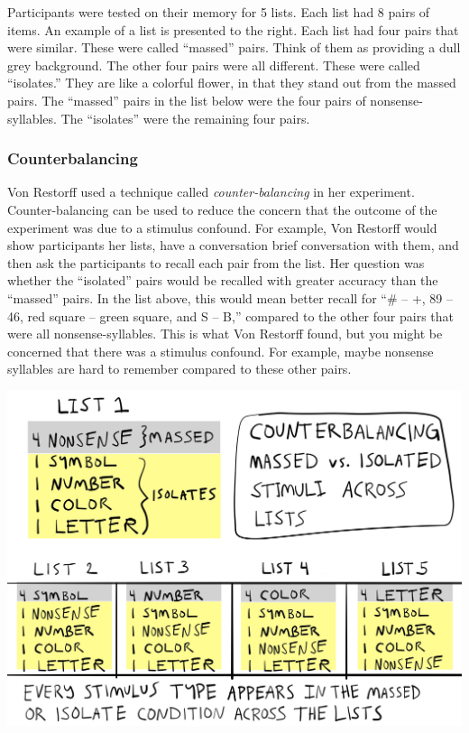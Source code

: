 \documentclass[
  oneside,
  12pt]{crumpbook}
\newenvironment{floatright50}{%
  \wrapfigure{R}{.5\textwidth}%
  }{%
  \endwrapfigure}
\begin{document}
Participants were tested on their memory for 5 lists. Each list had 8 pairs of items. An example of a list is presented to the right. Each list had four pairs that were similar. These were called ``massed'' pairs. Think of them as providing a dull grey background. The other four pairs were all different. These were called ``isolates.'' They are like a colorful flower, in that they stand out from the massed pairs. The ``massed'' pairs in the list below were the four pairs of nonsense-syllables. The ``isolates'' were the remaining four pairs.

\hypertarget{counterbalancing}{%
\subsubsection{Counterbalancing}\label{counterbalancing}}

Von Restorff used a technique called \emph{counter-balancing} in her experiment. Counter-balancing can be used to reduce the concern that the outcome of the experiment was due to a stimulus confound. For example, Von Restorff would show participants her lists, have a conversation brief conversation with them, and then ask the participants to recall each pair from the list. Her question was whether the ``isolated'' pairs would be recalled with greater accuracy than the ``massed'' pairs. In the list above, this would mean better recall for ``\# -- +, 89 -- 46, red square -- green square, and S -- B,'' compared to the other four pairs that were all nonsense-syllables. This is what Von Restorff found, but you might be concerned that there was a stimulus confound. For example, maybe nonsense syllables are hard to remember compared to these other pairs.

\begin{floatright50}
\includegraphics[width=1\linewidth]{imgs/Von_Restorff_counterbalance}

\end{floatright50}
\end{document}
